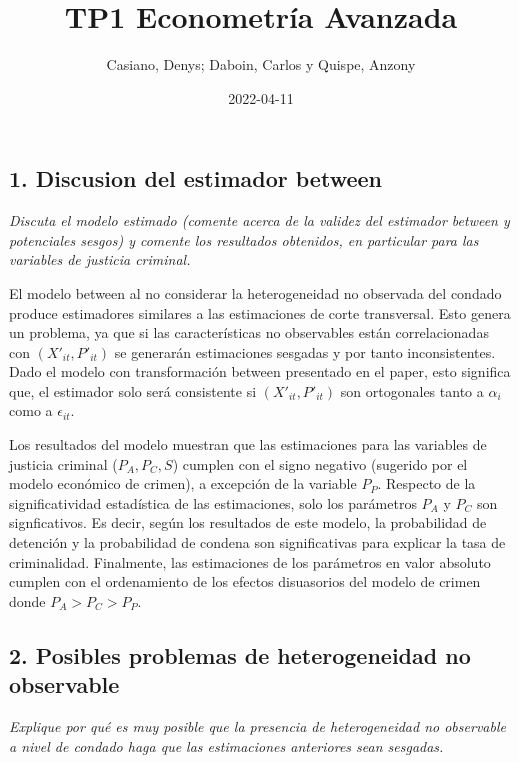 \documentclass[
]{article}
\title{TP1 Econometría Avanzada}
\author{Casiano, Denys; Daboin, Carlos y Quispe, Anzony}
\date{2022-04-11}
\begin{document}
\maketitle

\hypertarget{discusion-del-estimador-between}{%
\subsection{1. Discusion del estimador
between}\label{discusion-del-estimador-between}}

\emph{Discuta el modelo estimado (comente acerca de la validez del
estimador between y potenciales sesgos) y comente los resultados
obtenidos, en particular para las variables de justicia criminal.}

El modelo between al no considerar la heterogeneidad no observada del
condado produce estimadores similares a las estimaciones de corte
transversal. Esto genera un problema, ya que si las características no
observables están correlacionadas con \((X'_{it},P'_{it})\) se generarán
estimaciones sesgadas y por tanto inconsistentes. Dado el modelo con
transformación between presentado en el paper, esto significa que, el
estimador solo será consistente si \((X'_{it},P'_{it})\) son ortogonales
tanto a \(\alpha_i\) como a \(\epsilon_{it}\).

Los resultados del modelo muestran que las estimaciones para las
variables de justicia criminal (\(P_A, P_C, S\)) cumplen con el signo
negativo (sugerido por el modelo económico de crimen), a excepción de la
variable \(P_P\). Respecto de la significatividad estadística de las
estimaciones, solo los parámetros \(P_A\) y \(P_C\) son signficativos.
Es decir, según los resultados de este modelo, la probabilidad de
detención y la probabilidad de condena son significativas para explicar
la tasa de criminalidad. Finalmente, las estimaciones de los parámetros
en valor absoluto cumplen con el ordenamiento de los efectos disuasorios
del modelo de crimen donde \(P_A>P_C>P_P\).

\hypertarget{posibles-problemas-de-heterogeneidad-no-observable}{%
\subsection{2. Posibles problemas de heterogeneidad no
observable}\label{posibles-problemas-de-heterogeneidad-no-observable}}

\emph{Explique por qué es muy posible que la presencia de heterogeneidad
no observable a nivel de condado haga que las estimaciones anteriores
sean sesgadas. }
\end{document}
